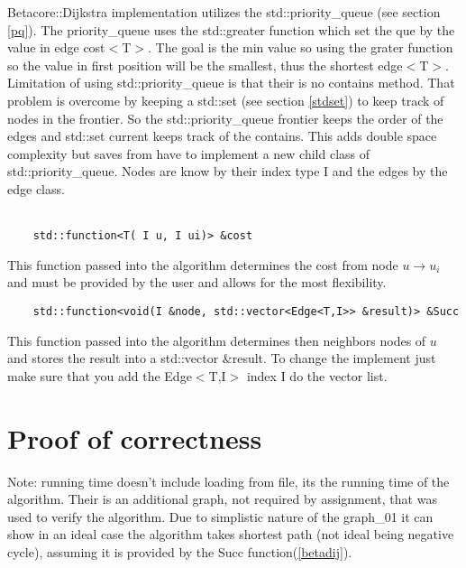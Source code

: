 \documentclass[12pt]{article}
\begin{document}
Betacore::Dijkstra implementation utilizes the std::priority\_queue (see section \ref{pq}).
The priority\_queue uses the std::greater function which set the que by the value in edge cost$<$T$>$. The goal is the min value so using the grater function
so the value in first position will be the smallest, thus the shortest edge$<$T$>$. 
Limitation of using std::priority\_queue is that their is no contains method. That 
problem is overcome by keeping a std::set (see section \ref{stdset}) to keep track of nodes in the frontier.
So the std::priority\_queue frontier keeps the order of the edges and std::set current keeps track of the contains.
This adds double space complexity but saves from have to implement a new child class of std::priority\_queue. Nodes 
are know by their index type I and the edges  by the edge class.
\\
\\

\begin{lstlisting}
	std::function<T( I u, I ui)> &cost
\end{lstlisting}
This function passed into the algorithm determines the cost from node $u \to u_i$ and 
must be provided by the user and allows for the most flexibility.
\\
\begin{lstlisting}
	std::function<void(I &node, std::vector<Edge<T,I>> &result)> &Succ
\end{lstlisting}
This function passed into the algorithm determines then neighbors nodes of $u$ and
stores the result into a std::vector \&result. To change the implement just make sure
that you add the Edge$<$T,I$>$ index I do the vector list.

\section{Proof of correctness}
Note: running time doesn't include loading from file, its the running time of the algorithm. 
Their is an additional graph, not required by assignment,
that was used to verify the algorithm.
Due to simplistic nature of the graph\_01 it can show in an ideal case the algorithm takes shortest path (not ideal being negative cycle),
assuming it is provided by the Succ function(\ref{betadij}). 
\end{document}

